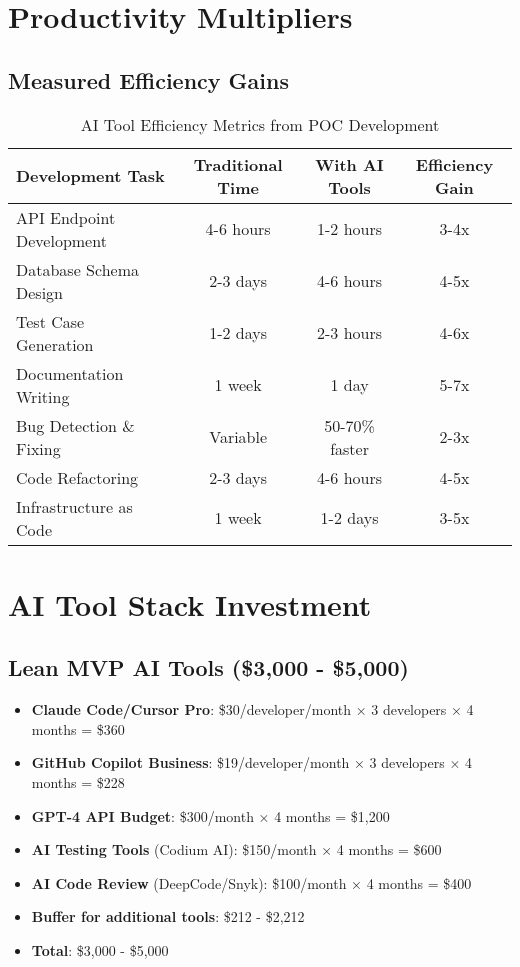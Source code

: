 \documentclass[12pt,a4paper]{report}
\begin{document}
\section{Productivity Multipliers}

\subsection{Measured Efficiency Gains}
\begin{table}[H]
\centering
\begin{tabularx}{\textwidth}{|X|c|c|c|}
\hline
\textbf{Development Task} & \textbf{Traditional Time} & \textbf{With AI Tools} & \textbf{Efficiency Gain} \\
\hline
API Endpoint Development & 4-6 hours & 1-2 hours & 3-4x \\
Database Schema Design & 2-3 days & 4-6 hours & 4-5x \\
Test Case Generation & 1-2 days & 2-3 hours & 4-6x \\
Documentation Writing & 1 week & 1 day & 5-7x \\
Bug Detection \& Fixing & Variable & 50-70\% faster & 2-3x \\
Code Refactoring & 2-3 days & 4-6 hours & 4-5x \\
Infrastructure as Code & 1 week & 1-2 days & 3-5x \\
\hline
\end{tabularx}
\caption{AI Tool Efficiency Metrics from POC Development}
\end{table}

\section{AI Tool Stack Investment}

\subsection{Lean MVP AI Tools (\$3,000 - \$5,000)}
\begin{itemize}
    \item \textbf{Claude Code/Cursor Pro}: \$30/developer/month × 3 developers × 4 months = \$360
    \item \textbf{GitHub Copilot Business}: \$19/developer/month × 3 developers × 4 months = \$228
    \item \textbf{GPT-4 API Budget}: \$300/month × 4 months = \$1,200
    \item \textbf{AI Testing Tools} (Codium AI): \$150/month × 4 months = \$600
    \item \textbf{AI Code Review} (DeepCode/Snyk): \$100/month × 4 months = \$400
    \item \textbf{Buffer for additional tools}: \$212 - \$2,212
    \item \textbf{Total}: \$3,000 - \$5,000
\end{itemize}
\end{document}
